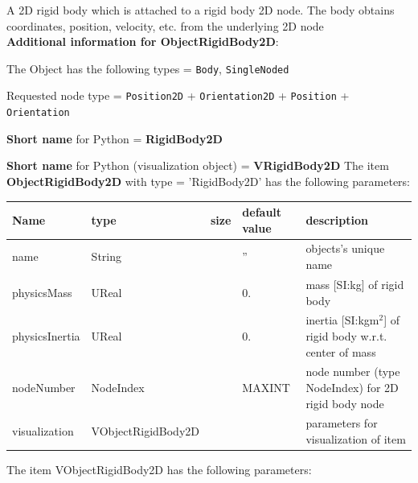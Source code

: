 \label{sec:item:ObjectRigidBody2D}
A 2D rigid body which is attached to a rigid body 2D node. The body obtains coordinates, position, velocity, etc. from the underlying 2D node\vspace{12pt}
 \\{\bf Additional information for ObjectRigidBody2D}:
\bi
  \item The Object has the following types = \texttt{Body}, \texttt{SingleNoded}
  \item Requested node type = \texttt{Position2D} + \texttt{Orientation2D} + \texttt{Position} + \texttt{Orientation}
  \item {\bf Short name} for Python = {\bf RigidBody2D}  \item {\bf Short name} for Python (visualization object) = {\bf VRigidBody2D}\ei
\vspace{12pt} \noindent The item {\bf ObjectRigidBody2D} with type = 'RigidBody2D' has the following parameters:\vspace{-1cm}\\ 
\begin{center}
  \footnotesize
  \begin{longtable}{| p{4.5cm} | p{2.5cm} | p{0.5cm} | p{2.5cm} | p{6cm} |}
    \hline
    \bf Name & \bf type & \bf size & \bf default value & \bf description \\ \hline
    name &     String &      &     '' &     objects's unique name\\ \hline
    physicsMass &     UReal &      &     0. &     mass [SI:kg] of rigid body\\ \hline
    physicsInertia &     UReal &      &     0. &     inertia [SI:kgm$^2$] of rigid body w.r.t. center of mass\\ \hline
    nodeNumber &     NodeIndex &      &     MAXINT &     node number (type NodeIndex) for 2D rigid body node\\ \hline
    visualization & VObjectRigidBody2D & & & parameters for visualization of item \\ \hline
	  \end{longtable}
	\end{center}
The item VObjectRigidBody2D has the following parameters:\vspace{-1cm}\\ 
